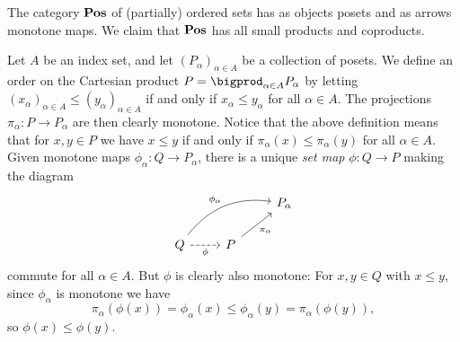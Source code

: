 \documentclass[article, a4paper, 11pt, oneside]{memoir}
\numberwithin{equation}{chapter}
\theoremstyle{nonumberplain}
\begin{document}
\begin{remarkbreak}
    The category $\mathbf{Pos}$ of (partially) ordered sets has as objects posets and as arrows monotone maps. We claim that $\mathbf{Pos}$ has all small products and coproducts.

    Let $A$ be an index set, and let $(P_\alpha)_{\alpha \in A}$ be a collection of posets. We define an order on the Cartesian product $P = \bigprod_{\alpha \in A} P_\alpha$ by letting $(x_\alpha)_{\alpha \in A} \leq (y_\alpha)_{\alpha \in A}$ if and only if $x_\alpha \leq y_\alpha$ for all $\alpha \in A$. The projections $\pi_\alpha \colon P \to P_\alpha$ are then clearly monotone. Notice that the above definition means that for $x,y \in P$ we have $x \leq y$ if and only if $\pi_\alpha(x) \leq \pi_\alpha(y)$ for all $\alpha \in A$. Given monotone maps $\phi_\alpha \colon Q \to P_\alpha$, there is a unique \emph{set map} $\phi \colon Q \to P$ making the diagram
    \begin{equation*}
        \begin{tikzcd}
            && P_\alpha \\
            Q
                \ar[r, "\phi", swap, dashed]
                \ar[urr, "\phi_\alpha", bend left]
            & P
                \ar[ur, "\pi_\alpha", swap]
        \end{tikzcd}
    \end{equation*}
    commute for all $\alpha \in A$. But $\phi$ is clearly also monotone: For $x,y \in Q$ with $x \leq y$, since $\phi_\alpha$ is monotone we have 
    \begin{equation*}
        \pi_\alpha(\phi(x))
            = \phi_\alpha(x)
            \leq \phi_\alpha(y)
            = \pi_\alpha(\phi(y)),
    \end{equation*}
    so $\phi(x) \leq \phi(y)$.


\end{remarkbreak}
\end{document}
